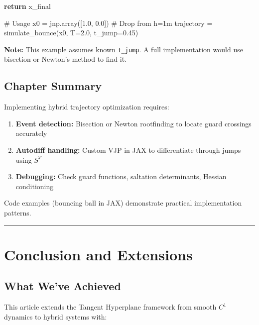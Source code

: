 \documentclass[
  letterpaper,
  DIV=11,
  numbers=noendperiod]{scrartcl}
\newenvironment{Shaded}{\begin{snugshade}}{\end{snugshade}}
\newcommand{\CommentTok}[1]{\textcolor[rgb]{0.37,0.37,0.37}{#1}}
\newcommand{\ControlFlowTok}[1]{\textcolor[rgb]{0.00,0.23,0.31}{\textbf{#1}}}
\newcommand{\FloatTok}[1]{\textcolor[rgb]{0.68,0.00,0.00}{#1}}
\newcommand{\NormalTok}[1]{\textcolor[rgb]{0.00,0.23,0.31}{#1}}
\newcommand{\OperatorTok}[1]{\textcolor[rgb]{0.37,0.37,0.37}{#1}}
\providecommand{\tightlist}{%
  \setlength{\itemsep}{0pt}\setlength{\parskip}{0pt}}\usepackage{longtable,booktabs,array}
\begin{document}
\begin{Shaded}
\begin{Highlighting}[]
    \ControlFlowTok{return}\NormalTok{ x\_final}

\CommentTok{\# Usage}
\NormalTok{x0 }\OperatorTok{=}\NormalTok{ jnp.array([}\FloatTok{1.0}\NormalTok{, }\FloatTok{0.0}\NormalTok{])  }\CommentTok{\# Drop from h=1m}
\NormalTok{trajectory }\OperatorTok{=}\NormalTok{ simulate\_bounce(x0, T}\OperatorTok{=}\FloatTok{2.0}\NormalTok{, t\_jump}\OperatorTok{=}\FloatTok{0.45}\NormalTok{)}
\end{Highlighting}
\end{Shaded}

\textbf{Note:} This example assumes known \texttt{t\_jump}. A full
implementation would use bisection or Newton's method to find it.

\subsection{Chapter Summary}\label{chapter-summary-7}

Implementing hybrid trajectory optimization requires:

\begin{enumerate}
\def\labelenumi{\arabic{enumi}.}
\tightlist
\item
  \textbf{Event detection:} Bisection or Newton rootfinding to locate
  guard crossings accurately
\item
  \textbf{Autodiff handling:} Custom VJP in JAX to differentiate through
  jumps using \(S^T\)
\item
  \textbf{Debugging:} Check guard functions, saltation determinants,
  Hessian conditioning
\end{enumerate}

Code examples (bouncing ball in JAX) demonstrate practical
implementation patterns.

\begin{center}\rule{0.5\linewidth}{0.5pt}\end{center}

\section{Conclusion and Extensions}\label{conclusion-and-extensions}

\subsection{What We've Achieved}\label{what-weve-achieved}

This article extends the Tangent Hyperplane framework from smooth
\(C^1\) dynamics to hybrid systems with:
\end{document}
